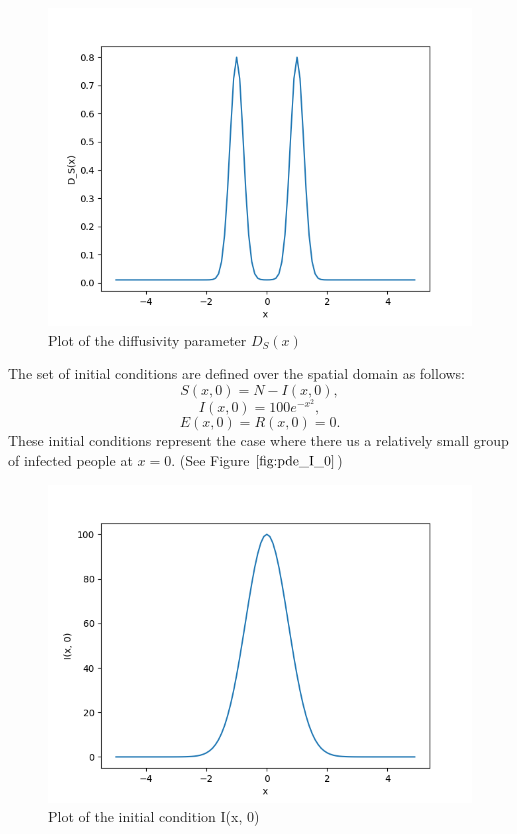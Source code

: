 \documentclass{article}
\begin{document}
\begin{figure}[H]
\centering
\includegraphics[width=0.7\linewidth]{./figures/pde_D_s}
\caption{Plot of the diffusivity parameter $D_S(x)$}
\label{fig:pde_D_s}
\end{figure}

The set of initial conditions are defined over the spatial domain as follows:
\begin{equation}
S(x, 0) = N - I(x, 0),
\end{equation}
\begin{equation}
I(x, 0) = 100e^{-x^2},
\end{equation}
\begin{equation}
E(x, 0) = R(x, 0) = 0.
\end{equation}
These initial conditions represent the case where there us a relatively small group of infected people at $x=0$. (See Figure $\ref{fig:pde_I_0}$)

\begin{figure}[H]
\centering
\includegraphics[width=0.7\linewidth]{./figures/pde_I_0}
\caption{Plot of the initial condition I(x, 0)}
\label{fig:pde_I_0}
\end{figure}
\end{document}

